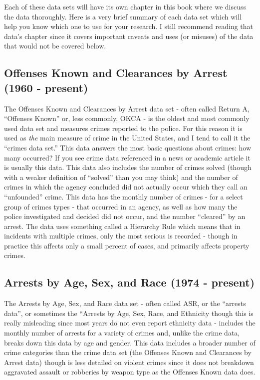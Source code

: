 \documentclass[
]{krantz}
\begin{document}
Each of these data sets will have its own chapter in this
book where we discuss the data thoroughly. Here is a very
brief summary of each data set which will help you know which
one to use for your research. I still recommend reading that
data's chapter since it covers important caveats and uses
(or misuses) of the data that would not be covered below.

\subsection{Offenses Known and Clearances by Arrest (1960 -
present)}\label{offenses-known-and-clearances-by-arrest-1960---present}

The Offenses Known and Clearances by Arrest data set - often
called Return A, ``Offenses Known'' or, less commonly, OKCA
- is the oldest and most commonly used data set and measures
crimes reported to the police. For this reason it is used as
\emph{the} main measure of crime in the United States, and I
tend to call it the ``crimes data set.'' This data answers
the most basic questions about crimes: how many occurred? If
you see crime data referenced in a news or academic article
it is usually this data. This data also includes the number
of crimes solved (though with a weaker definition of
``solved'' than you may think) and the number of crimes in
which the agency concluded did not actually occur which they
call an ``unfounded'' crime. This data has the monthly
number of crimes - for a select group of crimes types - that
occurred in an agency, as well as how many the police
investigated and decided did not occur, and the number
``cleared'' by an arrest. The data uses something called a
Hierarchy Rule which means that in incidents with multiple
crimes, only the most serious is recorded - though in
practice this affects only a small percent of cases, and
primarily affects property crimes.

\subsection{Arrests by Age, Sex, and Race (1974 -
present)}\label{arrests-by-age-sex-and-race-1974---present}

The Arrests by Age, Sex, and Race data set - often called
ASR, or the ``arrests data'', or sometimes the ``Arrests by
Age, Sex, Race, and Ethnicity though this is really
misleading since most years do not even report ethnicity
data - includes the monthly number of arrests for a variety
of crimes and, unlike the crime data, breaks down this data
by age and gender. This data includes a broader number of
crime categories than the crime data set (the Offenses Known
and Clearances by Arrest data) though is less detailed on
violent crimes since it does not breakdown aggravated
assault or robberies by weapon type as the Offenses Known
data does.
\end{document}
